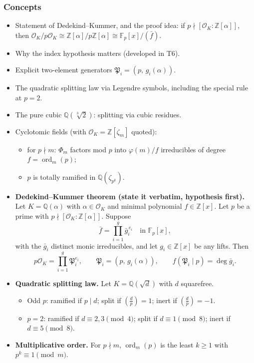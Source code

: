 \documentclass[11pt]{article}
\newcommand{\Z}{\mathbb{Z}}
\newcommand{\Q}{\mathbb{Q}}
\newcommand{\F}{\mathbb{F}}
\newcommand{\OK}{\mathcal{O}_K}
\newcommand{\fP}{\mathfrak{P}}
\newcommand{\legendre}[2]{\left(\frac{#1}{#2}\right)}
\DeclareMathOperator{\ord}{ord}
\begin{document}
\subsubsection*{Concepts}
\begin{itemize}
  \item Statement of Dedekind--Kummer, and the proof idea: if $p\nmid[\OK:\Z[\alpha]]$, then $\OK/p\OK\cong\Z[\alpha]/p\Z[\alpha]\cong\F_p[x]/(\bar f)$.
  \item Why the index hypothesis matters (developed in T6).
  \item Explicit two-element generators $\fP_i=(p,\,g_i(\alpha))$.
  \item The quadratic splitting law via Legendre symbols, including the special rule at $p=2$.
  \item The pure cubic $\Q(\sqrt[3]2)$: splitting via cubic residues.
  \item Cyclotomic fields (with $\OK=\Z[\zeta_m]$ quoted):
  \begin{itemize}
    \item for $p\nmid m$: $\Phi_m$ factors mod $p$ into $\varphi(m)/f$ irreducibles of degree $f=\ord_m(p)$;
    \item $p$ is totally ramified in $\Q(\zeta_{p^k})$.
  \end{itemize}
\end{itemize}

\begin{keydefs}
\begin{itemize}
  \item \textbf{Dedekind--Kummer theorem (state it verbatim, hypothesis first).} Let $K=\Q(\alpha)$ with $\alpha\in\OK$ and minimal polynomial $f\in\Z[x]$. Let $p$ be a prime with $p\nmid[\OK:\Z[\alpha]]$. Suppose
  \[
  \bar f=\prod_{i=1}^g\bar g_i^{\,e_i}\quad\text{in }\F_p[x],
  \]
  with the $\bar g_i$ distinct monic irreducibles, and let $g_i\in\Z[x]$ be any lifts. Then
  \[
  p\OK=\prod_{i=1}^g\fP_i^{e_i},\qquad \fP_i=(p,\,g_i(\alpha)),\qquad f(\fP_i\mid p)=\deg\bar g_i.
  \]
  \item \textbf{Quadratic splitting law.} Let $K=\Q(\sqrt d)$ with $d$ squarefree.
  \begin{itemize}
    \item Odd $p$: ramified if $p\mid d$; split if $\legendre dp=1$; inert if $\legendre dp=-1$.
    \item $p=2$: ramified if $d\equiv2,3\pmod4$; split if $d\equiv1\pmod8$; inert if $d\equiv5\pmod8$.
  \end{itemize}
  \item \textbf{Multiplicative order.} For $p\nmid m$, $\ord_m(p)$ is the least $k\ge1$ with $p^k\equiv1\pmod m$.
\end{itemize}
\end{keydefs}
\end{document}
